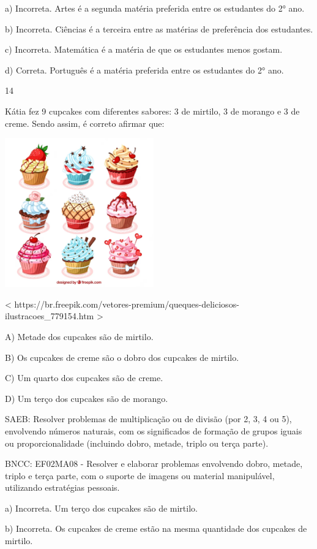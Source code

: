 \begin{escolha}
\begin{escolha}
{{{{{{{{a) Incorreta. Artes é a segunda matéria preferida entre os estudantes do 2° ano.

b) Incorreta. Ciências é a terceira entre as matérias de
preferência dos estudantes.

c) Incorreta. Matemática é a matéria de que os estudantes menos gostam.

d) Correta. Português é a matéria preferida entre os estudantes do 2° ano.

\num{14}

Kátia fez 9 cupcakes com diferentes sabores: 3 de mirtilo, 3 de morango
e 3 de creme. Sendo assim, é correto afirmar que:

\includegraphics[width=2.53125in,height=2.53125in]{media/image161.png}

\textless{}
https://br.freepik.com/vetores-premium/queques-deliciosos-ilustracoes\_779154.htm
\textgreater{}

A) Metade dos cupcakes são de mirtilo.

B) Os cupcakes de creme são o dobro dos cupcakes de mirtilo.

C) Um quarto dos cupcakes são de creme.

D) Um terço dos cupcakes são de morango.

SAEB: Resolver problemas de multiplicação ou de divisão (por 2,
3, 4 ou 5), envolvendo números naturais, com os significados de formação
de grupos iguais ou proporcionalidade (incluindo dobro, metade, triplo
ou terça parte).

BNCC: EF02MA08 - Resolver e elaborar
problemas envolvendo dobro, metade, triplo e terça parte, com o suporte
de imagens ou material manipulável, utilizando estratégias pessoais.

a) Incorreta. Um terço dos cupcakes são de mirtilo.

b) Incorreta. Os cupcakes de creme estão na mesma quantidade dos cupcakes de mirtilo.

}}}}}}}}
\end{escolha}
\end{escolha}
